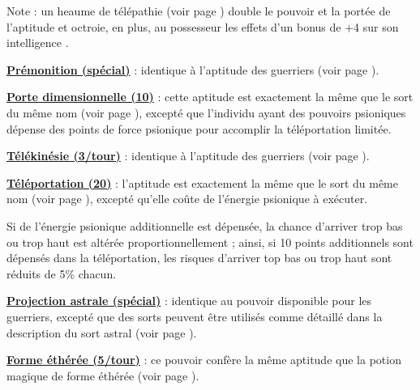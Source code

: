 Note : un heaume de télépathie (voir page \pageref{objet-heaume-telepathie}) double le pouvoir et la portée de l'aptitude et octroie, en plus, au possesseur les effets d'un bonus de +4 sur son intelligence .

\bigskip

\textbf{\uline{Prémonition (spécial)}} : identique à l'aptitude des guerriers (voir page \pageref{guerrier-premonition}).

\bigskip

\label{magicien-porte-dimensionnelle}\textbf{\uline{Porte dimensionnelle (10)}} : cette aptitude est exactement la même que le sort du même nom (voir page \pageref{sort-porte-dimensionnelle}), excepté que l'individu ayant des pouvoirs psioniques dépense des points de force psionique pour accomplir la téléportation limitée.

\bigskip

\textbf{\uline{Télékinésie (3/tour)}} : identique à l'aptitude des guerriers (voir page \pageref{guerrier-telekinesie}).

\bigskip

\label{magicien-teleportation}\textbf{\uline{Téléportation (20)}} : l'aptitude est exactement la même que le sort du même nom (voir page \pageref{sort-teleporter}), excepté qu'elle coûte de l'énergie psionique à exécuter.

\bigskip

Si de l'énergie psionique additionnelle est dépensée, la chance d'arriver trop bas ou trop haut est altérée proportionnellement ; ainsi, si 10 points additionnels sont dépensés dans la téléportation, les risques d'arriver top bas ou trop haut sont réduits de 5\% chacun.

\bigskip

\label{magicien-projection-astrale}\textbf{\uline{Projection astrale (spécial)}} : identique au pouvoir disponible pour les guerriers, excepté que des sorts peuvent être utilisés comme détaillé dans la description du sort astral (voir page \pageref{sort-astral}).

\bigskip

\label{magicien-forme-etheree}\textbf{\uline{Forme éthérée (5/tour)}} : ce pouvoir confère la même aptitude que la potion magique de forme éthérée (voir page \pageref{objet-huile-etheree}).

\bigskip

